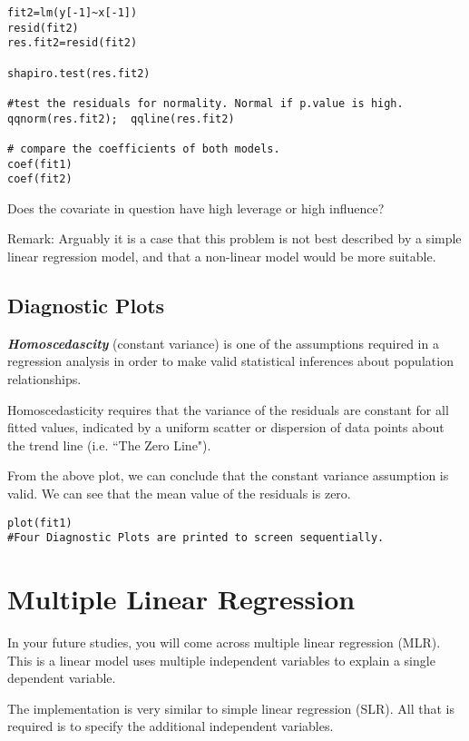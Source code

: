 \begin{framed}
\begin{verbatim}
fit2=lm(y[-1]~x[-1])
resid(fit2)
res.fit2=resid(fit2)

shapiro.test(res.fit2)			

#test the residuals for normality. Normal if p.value is high.
qqnorm(res.fit2);  qqline(res.fit2)			

# compare the coefficients of both models.
coef(fit1)
coef(fit2)

\end{verbatim}
\end{framed}
Does the covariate in question have high leverage or high influence?


Remark: Arguably it is a case that this problem is not best described by a simple linear regression model, and that a non-linear model would be more suitable.

\subsection{Diagnostic Plots}
\textbf{\emph{Homoscedascity }}(constant variance) is one of the assumptions required in a regression analysis in order to make valid statistical inferences about population relationships.

Homoscedasticity requires that the variance of the residuals are constant for all fitted values, indicated by a uniform scatter or dispersion of data points about the trend line (i.e. ``The Zero Line").

From the above plot, we can conclude that the constant variance assumption is valid. We can see that the mean value of the residuals is zero.
\begin{framed}
\begin{verbatim}
plot(fit1)
#Four Diagnostic Plots are printed to screen sequentially.
\end{verbatim}
\end{framed}
\newpage
\section{Multiple Linear Regression}
In your future studies, you will come across multiple linear regression (MLR). This is a linear model uses multiple independent variables to explain a single dependent variable.

The implementation is very similar to simple linear regression (SLR). All that is required is to specify the additional independent variables.

